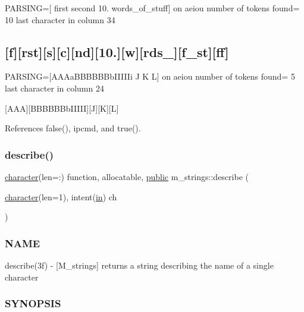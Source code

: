 P\+A\+R\+S\+I\+NG=\mbox{[} first second 10. words\+\_\+of\+\_\+stuff\mbox{]} on aeiou number of tokens found= 10 last character in column 34

\subsection*{\mbox{[}f\mbox{]}\mbox{[}rst\mbox{]}\mbox{[}s\mbox{]}\mbox{[}c\mbox{]}\mbox{[}nd\mbox{]}\mbox{[}10.\mbox{]}\mbox{[}w\mbox{]}\mbox{[}rds\+\_\+\mbox{]}\mbox{[}f\+\_\+st\mbox{]}\mbox{[}ff\mbox{]} }

P\+A\+R\+S\+I\+NG=\mbox{[}A\+A\+Aa\+B\+B\+B\+B\+B\+Bb\+I\+I\+I\+I\+Ii J K L\mbox{]} on aeiou number of tokens found= 5 last character in column 24

\mbox{[}A\+AA\mbox{]}\mbox{[}B\+B\+B\+B\+B\+Bb\+I\+I\+I\+II\mbox{]}\mbox{[}J\mbox{]}\mbox{[}K\mbox{]}\mbox{[}L\mbox{]} 

References false(), ipcmd, and true().

\mbox{\label{namespacem__strings_a8d7007f0c34d7db4c004dac56e609b3f}} 
\subsubsection{\texorpdfstring{describe()}{describe()}}
{\footnotesize\ttfamily \hyperlink{option__stopwatch_83_8txt_abd4b21fbbd175834027b5224bfe97e66}{character}(len=\+:) function, allocatable, \hyperlink{M__stopwatch_83_8txt_a2f74811300c361e53b430611a7d1769f}{public} m\+\_\+strings\+::describe (\begin{DoxyParamCaption}\item[{\hyperlink{option__stopwatch_83_8txt_abd4b21fbbd175834027b5224bfe97e66}{character}(len=1), intent(\hyperlink{M__journal_83_8txt_afce72651d1eed785a2132bee863b2f38}{in})}]{ch }\end{DoxyParamCaption})}



\subsubsection*{N\+A\+ME}

describe(3f) -\/ \mbox{[}M\+\_\+strings\mbox{]} returns a string describing the name of a single character 

\subsubsection*{S\+Y\+N\+O\+P\+S\+IS}

